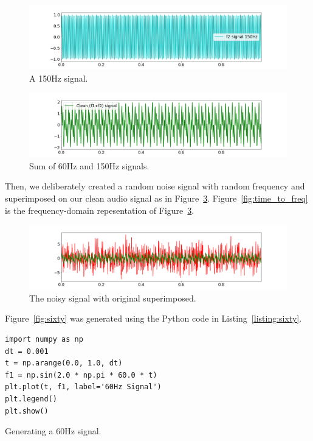 \documentclass[a4paper, 12pt]{scrartcl}
\begin{document}
\begin{figure}[H] 
  \centering
  \includegraphics[width=\textwidth]{img/signal_150hz.png}
  \caption{A 150Hz signal.}
  \label{fig:onefifty}
\end{figure}

\begin{figure}[H] 
  \centering
  \includegraphics[width=\textwidth]{img/sum_signals.png}
  \caption{Sum of 60Hz and 150Hz signals.}
  \label{fig:sumsignals}
\end{figure}

Then, we deliberately created a random noise signal with random frequency and superimposed on our clean audio signal as in Figure~\ref{fig:original_noisy}. 
Figure~\ref{fig:time_to_freq} is the frequency-domain repesentation of Figure~\ref{fig:original_noisy}.

\begin{figure}[H] 
  \centering
  \includegraphics[width=\textwidth]{img/original_noisy.png}
  \caption{The noisy signal with original superimposed.}
  \label{fig:original_noisy}
\end{figure}

Figure~\ref{fig:sixty} was generated using the Python code in Listing~\ref{listing:sixty}.

\begin{listing}[h]
\begin{verbatim}
import numpy as np
dt = 0.001
t = np.arange(0.0, 1.0, dt)
f1 = np.sin(2.0 * np.pi * 60.0 * t)
plt.plot(t, f1, label='60Hz Signal')
plt.legend()
plt.show()
\end{verbatim}
\caption{Generating a 60Hz signal.}
\label{listing:sixty}
\end{listing}
\end{document}
